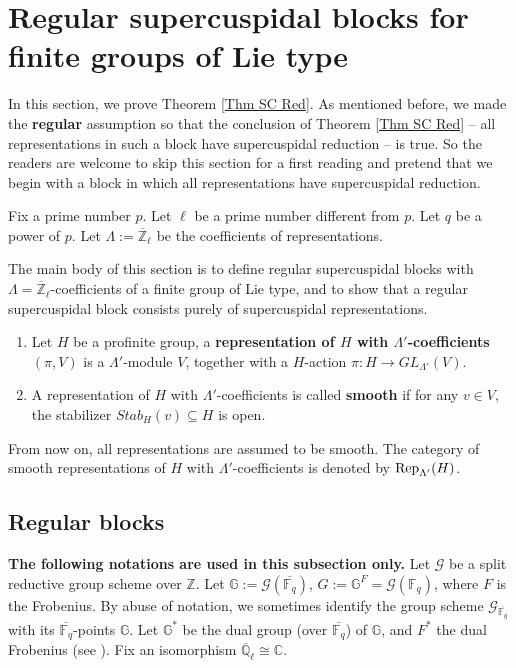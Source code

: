 		
		
		
		\section{Regular supercuspidal blocks for finite groups of Lie type}\label{Sec Reg Cusp}
		
		In this section, we prove Theorem \ref{Thm SC Red}. As mentioned before, we made the \textbf{regular} assumption so that the conclusion of Theorem \ref{Thm SC Red} -- all representations in such a block have supercuspidal reduction -- is true. So the readers are welcome to skip this section for a first reading and pretend that we begin with a block in which all representations have supercuspidal reduction.
		
		Fix a prime number $p$. Let $\ell$ be a prime number different from $p$. Let $q$ be a power of $p$. Let $\Lambda:=\overline{\mathbb{Z}}_{\ell}$ be the coefficients of representations.
		
		The main body of this section is to define regular supercuspidal blocks with $\Lambda=\overline{\mathbb{Z}}_{\ell}$-coefficients of a finite group of Lie type, and to show that a regular supercuspidal block consists purely of supercuspidal representations.

		
		\begin{definition}
			\begin{enumerate}Let $\Lambda'$ be any ring.
				\item Let $H$ be a profinite group, a \textbf{representation of $H$ with $\Lambda'$-coefficients} $(\pi, V)$ is a $\Lambda'$-module $V$, together with a $H$-action $\pi: H \to GL_{\Lambda'}(V)$.
				\item A representation of $H$ with $\Lambda'$-coefficients is called \textbf{smooth} if for any $v \in V$, the stabilizer $Stab_H(v) \subseteq H$ is open.
			\end{enumerate}
		\end{definition}
		
		From now on, all representations are assumed to be smooth. The category of smooth representations of $H$ with $\Lambda'$-coefficients is denoted by $\operatorname{\operatorname{Rep}}_{\Lambda'}(H)$.
		
		\subsection{Regular blocks}
		
		\textbf{The following notations are used in this subsection only.} Let $\mathcal{G}$ be a split reductive group scheme over $\mathbb{Z}$. Let $\mathbb{G}:=\mathcal{G}(\overline{\mathbb{F}_q})$, $G:=\mathbb{G}^F=\mathcal{G}(\mathbb{F}_q)$, where $F$ is the Frobenius. By abuse of notation, we sometimes identify the group scheme $\mathcal{G}_{\overline{\mathbb{F}_q}}$ with its $\overline{\mathbb{F}_q}$-points $\mathbb{G}$. Let $\mathbb{G}^*$ be the dual group (over $\overline{\mathbb{F}_q}$) of $\mathbb{G}$, and $F^*$ the dual Frobenius (see \cite[Section 4.2]{carter1985finite}). Fix an isomorphism $\overline{\mathbb{Q}}_{\ell} \cong \mathbb{C}$. 
		
